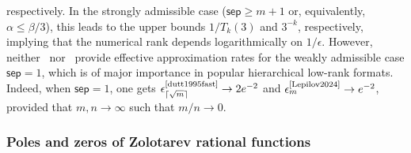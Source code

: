 \documentclass[final,reqno,onefignum,onetabnum]{siamart190516}
\newcommand{\sep}{\mathsf{sep}}
\begin{document}
respectively. In the strongly admissible case ($\sep \ge m+1$ or, equivalently, $\alpha \le \beta/3$), this leads to the upper bounds
$1/T_k(3)$ and $3^{-k}$, respectively, implying that the numerical rank depends logarithmically on $1/\epsilon$. However, neither~\cite{dutt1995fast,martinsson2005fast}
nor~\cite{Lepilov2024} provide effective approximation rates for the weakly admissible case $\sep = 1$, which is of major importance in popular hierarchical low-rank formats. Indeed, when $\sep = 1$, one gets $\epsilon^{\text{\cite{dutt1995fast}}}_{\lceil \sqrt{m} \rceil} \to 2 e^{-2}$ and $\epsilon^{\text{\cite{Lepilov2024}}}_m \to e^{-2}$, provided that $m,n \to \infty$ such that $m/n \to 0$. 
 


\subsubsection{Poles and zeros of Zolotarev rational functions}
\label{sec:poleszeros}
\end{document}
